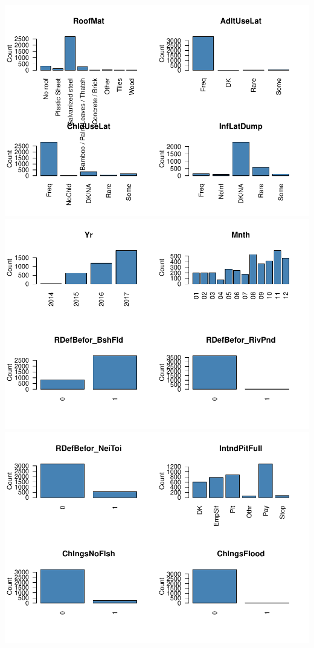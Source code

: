 \documentclass[11pt,]{article}
\begin{document}
\includegraphics{describe_FSMintentions_regional_seasonal_iDE-Camb_surveysOct2017_files/figure-latex/MCA_setup-4.pdf}
\includegraphics{describe_FSMintentions_regional_seasonal_iDE-Camb_surveysOct2017_files/figure-latex/MCA_setup-5.pdf}
\includegraphics{describe_FSMintentions_regional_seasonal_iDE-Camb_surveysOct2017_files/figure-latex/MCA_setup-6.pdf}
\end{document}
